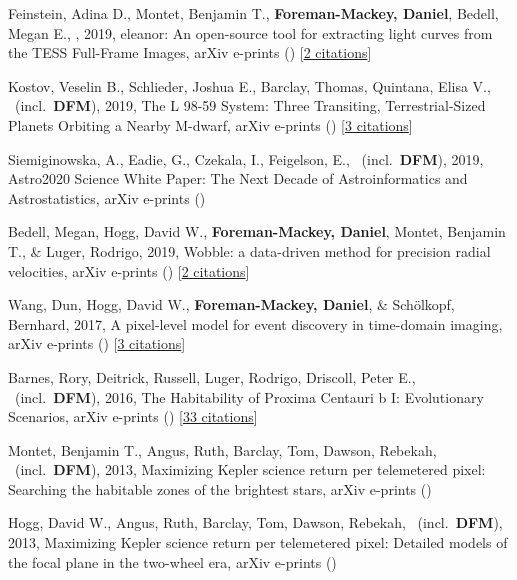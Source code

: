 \item[{\color{numcolor}\scriptsize8}] Feinstein, Adina D., Montet, Benjamin T., \textbf{Foreman-Mackey, Daniel}, Bedell, Megan E., \etal, 2019, eleanor: An open-source tool for extracting light curves from the TESS Full-Frame Images, arXiv e-prints () [\href{http://adsabs.harvard.edu/abs/2019arXiv190309152F}{2 citations}]

\item[{\color{numcolor}\scriptsize7}] Kostov, Veselin B., Schlieder, Joshua E., Barclay, Thomas, Quintana, Elisa V., \etal\ (incl.\ \textbf{DFM}), 2019, The L 98-59 System: Three Transiting, Terrestrial-Sized Planets Orbiting a Nearby M-dwarf, arXiv e-prints () [\href{http://adsabs.harvard.edu/abs/2019arXiv190308017K}{3 citations}]

\item[{\color{numcolor}\scriptsize6}] Siemiginowska, A., Eadie, G., Czekala, I., Feigelson, E., \etal\ (incl.\ \textbf{DFM}), 2019, Astro2020 Science White Paper: The Next Decade of Astroinformatics and Astrostatistics, arXiv e-prints ()

\item[{\color{numcolor}\scriptsize5}] Bedell, Megan, Hogg, David W., \textbf{Foreman-Mackey, Daniel}, Montet, Benjamin T., \& Luger, Rodrigo, 2019, Wobble: a data-driven method for precision radial velocities, arXiv e-prints () [\href{http://adsabs.harvard.edu/abs/2019arXiv190100503B}{2 citations}]

\item[{\color{numcolor}\scriptsize4}] Wang, Dun, Hogg, David W., \textbf{Foreman-Mackey, Daniel}, \& Sch{\"o}lkopf, Bernhard, 2017, A pixel-level model for event discovery in time-domain imaging, arXiv e-prints () [\href{http://adsabs.harvard.edu/abs/2017arXiv171002428W}{3 citations}]

\item[{\color{numcolor}\scriptsize3}] Barnes, Rory, Deitrick, Russell, Luger, Rodrigo, Driscoll, Peter E., \etal\ (incl.\ \textbf{DFM}), 2016, The Habitability of Proxima Centauri b I: Evolutionary Scenarios, arXiv e-prints () [\href{http://adsabs.harvard.edu/abs/2016arXiv160806919B}{33 citations}]

\item[{\color{numcolor}\scriptsize2}] Montet, Benjamin T., Angus, Ruth, Barclay, Tom, Dawson, Rebekah, \etal\ (incl.\ \textbf{DFM}), 2013, Maximizing Kepler science return per telemetered pixel: Searching the habitable zones of the brightest stars, arXiv e-prints ()

\item[{\color{numcolor}\scriptsize1}] Hogg, David W., Angus, Ruth, Barclay, Tom, Dawson, Rebekah, \etal\ (incl.\ \textbf{DFM}), 2013, Maximizing Kepler science return per telemetered pixel: Detailed models of the focal plane in the two-wheel era, arXiv e-prints ()